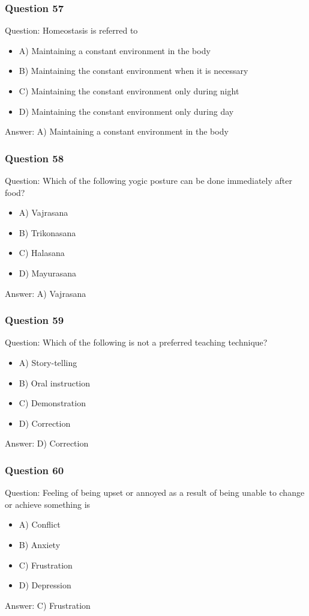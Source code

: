 \begin{frame}[fragile]\frametitle{Question 57}
Question: Homeostasis is referred to
\begin{itemize}
\item A) Maintaining a constant environment in the body
\item B) Maintaining the constant environment when it is necessary
\item C) Maintaining the constant environment only during night
\item D) Maintaining the constant environment only during day
\end{itemize}
Answer: A) Maintaining a constant environment in the body
\end{frame}

\begin{frame}[fragile]\frametitle{Question 58}
Question: Which of the following yogic posture can be done immediately after food?
\begin{itemize}
\item A) Vajrasana
\item B) Trikonasana
\item C) Halasana
\item D) Mayurasana
\end{itemize}
Answer: A) Vajrasana
\end{frame}

\begin{frame}[fragile]\frametitle{Question 59}
Question: Which of the following is not a preferred teaching technique?
\begin{itemize}
\item A) Story-telling
\item B) Oral instruction
\item C) Demonstration
\item D) Correction
\end{itemize}
Answer: D) Correction
\end{frame}

\begin{frame}[fragile]\frametitle{Question 60}
Question: Feeling of being upset or annoyed as a result of being unable to change or achieve something is
\begin{itemize}
\item A) Conflict
\item B) Anxiety
\item C) Frustration
\item D) Depression
\end{itemize}
Answer: C) Frustration
\end{frame}

